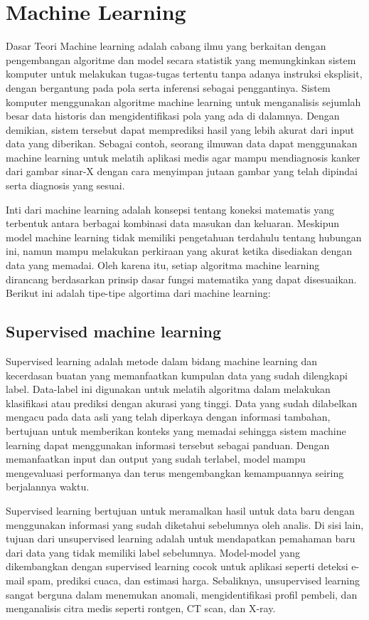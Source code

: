 \section{Machine Learning}
Dasar Teori Machine learning adalah cabang ilmu yang berkaitan dengan pengembangan algoritme dan model secara statistik yang memungkinkan sistem komputer untuk melakukan tugas-tugas tertentu tanpa adanya instruksi eksplisit, dengan bergantung pada pola serta inferensi sebagai penggantinya. Sistem komputer menggunakan algoritme machine learning untuk menganalisis sejumlah besar data historis dan mengidentifikasi pola yang ada di dalamnya. Dengan demikian, sistem tersebut dapat memprediksi hasil yang lebih akurat dari input data yang diberikan. Sebagai contoh, seorang ilmuwan data dapat menggunakan machine learning untuk melatih aplikasi medis agar mampu mendiagnosis kanker dari gambar sinar-X dengan cara menyimpan jutaan gambar yang telah dipindai serta diagnosis yang sesuai.

Inti dari machine learning adalah konsepsi tentang koneksi matematis yang terbentuk antara berbagai kombinasi data masukan dan keluaran. Meskipun model machine learning tidak memiliki pengetahuan terdahulu tentang hubungan ini, namun mampu melakukan perkiraan yang akurat ketika disediakan dengan data yang memadai. Oleh karena itu, setiap algoritma machine learning dirancang berdasarkan prinsip dasar fungsi matematika yang dapat disesuaikan. Berikut ini adalah tipe-tipe algortima dari machine learning:

\subsection{Supervised machine learning}
Supervised learning adalah metode dalam bidang machine learning dan kecerdasan buatan yang memanfaatkan kumpulan data yang sudah dilengkapi label. Data-label ini digunakan untuk melatih algoritma dalam melakukan klasifikasi atau prediksi dengan akurasi yang tinggi. Data yang sudah dilabelkan mengacu pada data asli yang telah diperkaya dengan informasi tambahan, bertujuan untuk memberikan konteks yang memadai sehingga sistem machine learning dapat menggunakan informasi tersebut sebagai panduan.
Dengan memanfaatkan input dan output yang sudah terlabel, model mampu mengevaluasi performanya dan terus mengembangkan kemampuannya seiring berjalannya waktu.

Supervised learning bertujuan untuk meramalkan hasil untuk data baru dengan menggunakan informasi yang sudah diketahui sebelumnya oleh analis. Di sisi lain, tujuan dari unsupervised learning adalah untuk mendapatkan pemahaman baru dari data yang tidak memiliki label sebelumnya. Model-model yang dikembangkan dengan supervised learning cocok untuk aplikasi seperti deteksi e-mail spam, prediksi cuaca, dan estimasi harga. Sebaliknya, unsupervised learning sangat berguna dalam menemukan anomali, mengidentifikasi profil pembeli, dan menganalisis citra medis seperti rontgen, CT scan, dan X-ray.


